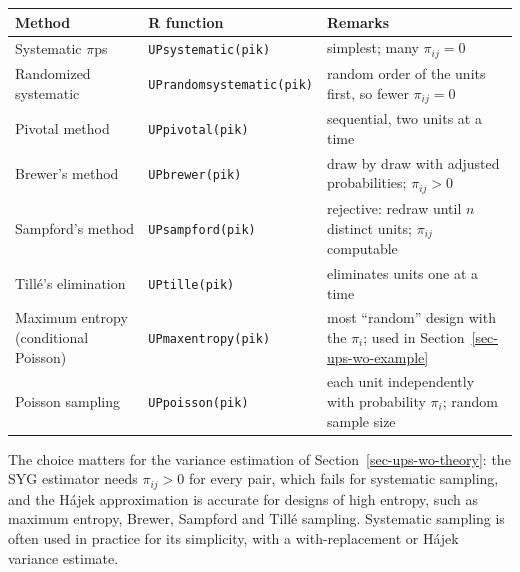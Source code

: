 \documentclass[
  letterpaper,
  DIV=11,
  numbers=noendperiod]{scrreprt}
\newcounter{none} %
\renewcommand{\[}{\begin{equation}}
\renewcommand{\]}{\end{equation}}
\begin{document}
{\def\LTcaptype{none} %
\begin{longtable}[]{@{}
  >{\raggedright\arraybackslash}p{}
  >{\raggedright\arraybackslash}p{}
  >{\raggedright\arraybackslash}p{}@{}}
\toprule\noalign{}
\begin{minipage}[b]{\linewidth}\raggedright
Method
\end{minipage} & \begin{minipage}[b]{\linewidth}\raggedright
R function
\end{minipage} & \begin{minipage}[b]{\linewidth}\raggedright
Remarks
\end{minipage} \\
\midrule\noalign{}
\endhead
\bottomrule\noalign{}
\endlastfoot
Systematic \(\pi\)ps & \texttt{UPsystematic(pik)} & simplest; many
\(\pi_{ij}=0\) \\
Randomized systematic & \texttt{UPrandomsystematic(pik)} & random order
of the units first, so fewer \(\pi_{ij}=0\) \\
Pivotal method & \texttt{UPpivotal(pik)} & sequential, two units at a
time \\
Brewer's method & \texttt{UPbrewer(pik)} & draw by draw with adjusted
probabilities; \(\pi_{ij}>0\) \\
Sampford's method & \texttt{UPsampford(pik)} & rejective: redraw until
\(n\) distinct units; \(\pi_{ij}\) computable \\
Tillé's elimination & \texttt{UPtille(pik)} & eliminates units one at a
time \\
Maximum entropy (conditional Poisson) & \texttt{UPmaxentropy(pik)} &
most ``random'' design with the \(\pi_i\); used in
Section~\ref{sec-ups-wo-example} \\
Poisson sampling & \texttt{UPpoisson(pik)} & each unit independently
with probability \(\pi_i\); random sample size \\
\end{longtable}
}

The choice matters for the variance estimation of
Section~\ref{sec-ups-wo-theory}: the SYG estimator needs \(\pi_{ij}>0\)
for every pair, which fails for systematic sampling, and the Hájek
approximation is accurate for designs of high entropy, such as maximum
entropy, Brewer, Sampford and Tillé sampling. Systematic sampling is
often used in practice for its simplicity, with a with-replacement or
Hájek variance estimate.
\end{document}
